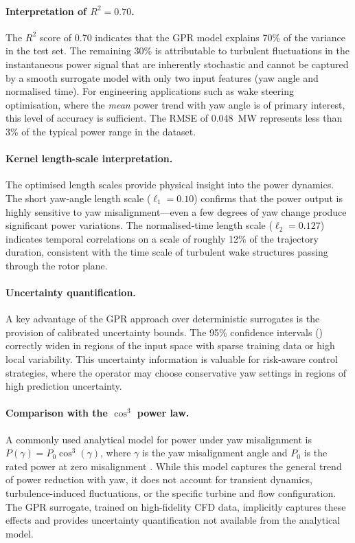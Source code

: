 \documentclass[12pt]{article}
\begin{document}
\paragraph{Interpretation of $R^2 = 0.70$.}
The $R^2$ score of 0.70 indicates that the GPR model explains 70\% of the variance in the test set.
The remaining 30\% is attributable to turbulent fluctuations in the instantaneous power signal that are inherently stochastic and cannot be captured by a smooth surrogate model with only two input features (yaw angle and normalised time).
For engineering applications such as wake steering optimisation, where the \emph{mean} power trend with yaw angle is of primary interest, this level of accuracy is sufficient.
The RMSE of 0.048~MW represents less than 3\% of the typical power range in the dataset.

\paragraph{Kernel length-scale interpretation.}
The optimised length scales provide physical insight into the power dynamics.
The short yaw-angle length scale ($\ell_1 = 0.10$) confirms that the power output is highly sensitive to yaw misalignment---even a few degrees of yaw change produce significant power variations.
The normalised-time length scale ($\ell_2 = 0.127$) indicates temporal correlations on a scale of roughly 12\% of the trajectory duration, consistent with the time scale of turbulent wake structures passing through the rotor plane.

\paragraph{Uncertainty quantification.}
A key advantage of the GPR approach over deterministic surrogates is the provision of calibrated uncertainty bounds.
The 95\% confidence intervals () correctly widen in regions of the input space with sparse training data or high local variability.
This uncertainty information is valuable for risk-aware control strategies, where the operator may choose conservative yaw settings in regions of high prediction uncertainty.

\paragraph{Comparison with the $\cos^3$ power law.}
A commonly used analytical model for power under yaw misalignment is $P(\gamma) = P_0 \cos^3(\gamma)$, where $\gamma$ is the yaw misalignment angle and $P_0$ is the rated power at zero misalignment \citep{Burton2011}.
While this model captures the general trend of power reduction with yaw, it does not account for transient dynamics, turbulence-induced fluctuations, or the specific turbine and flow configuration.
The GPR surrogate, trained on high-fidelity CFD data, implicitly captures these effects and provides uncertainty quantification not available from the analytical model.
\end{document}

